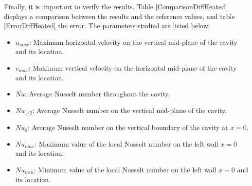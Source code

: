 Finally, it is important to verify the results. Table \ref{ComparisonDiffHeated} displays a comparison between the results and the reference values, and table \ref{ErrorDiffHeated} the error. The parameters studied are listed below:
\begin{itemize}
	\item $u_{max}$: Maximum horizontal velocity on the vertical mid-plane of the cavity and its location.
	\item $v_{max}$: Maximum vertical velocity on the horizontal mid-plane of the cavity and its location.
	\item $\overbar{Nu}$: Average Nusselt number throughout the cavity.
	\item $Nu_{1/2}$: Average Nusselt number on the vertical mid-plane of the cavity.
	\item $Nu_{0}$: Average Nusselt number on the vertical boundary of the cavity at $x=0$.
	\item $Nu_{max}$: Maximum value of the local Nusselt number on the left wall $x=0$ and its location.
	\item $Nu_{min}$: Minimum value of the local Nusselt number on the left wall $x=0$ and its location.
\end{itemize}
